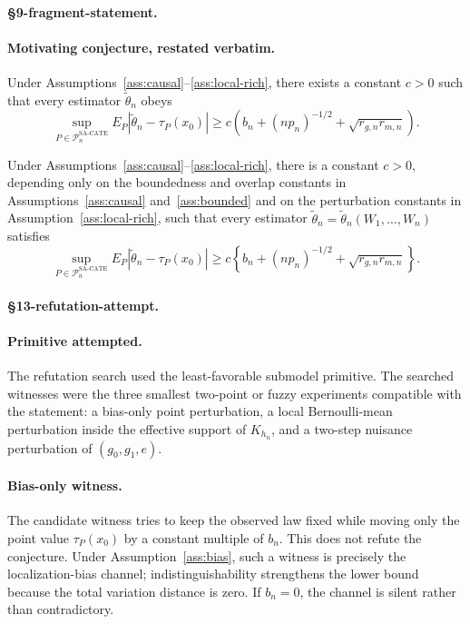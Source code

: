 \paragraph{\S9-fragment-statement.}
\paragraph{Motivating conjecture, restated verbatim.}
Under Assumptions~\ref{ass:causal}--\ref{ass:local-rich}, there exists a constant $c>0$ such that every estimator $\tilde\theta_n$ obeys
\[
  \sup_{P\in\mathcal{P}_n^{\mathrm{SA\text{-}CATE}}}
  E_P\left|\tilde\theta_n-\tau_P(x_0)\right|
  \ge c\left(b_n+(n p_n)^{-1/2}+\sqrt{r_{g,n}r_{m,n}}\right).
\]

\begin{theorem}\label{thm:lower}
Under Assumptions~\ref{ass:causal}--\ref{ass:local-rich}, there is a constant $c>0$, depending only on the boundedness and overlap constants in Assumptions~\ref{ass:causal} and~\ref{ass:bounded} and on the perturbation constants in Assumption~\ref{ass:local-rich}, such that every estimator $\tilde\theta_n=\tilde\theta_n(W_1,\ldots,W_n)$ satisfies \[ \sup_{P\in\mathcal{P}_n^{\mathrm{SA\text{-}CATE}}} E_P\!\left|\tilde\theta_n-\tau_P(x_0)\right| \ge c\left\{b_n+(n p_n)^{-1/2}+\sqrt{r_{g,n}r_{m,n}}\right\}. \]
\end{theorem}

\paragraph{\S13-refutation-attempt.}
\paragraph{Primitive attempted.}
The refutation search used the least-favorable submodel primitive.  The searched witnesses were the three smallest two-point or fuzzy experiments compatible with the statement: a bias-only point perturbation, a local Bernoulli-mean perturbation inside the effective support of $K_{h_n}$, and a two-step nuisance perturbation of $(g_0,g_1,e)$.

\paragraph{Bias-only witness.}
The candidate witness tries to keep the observed law fixed while moving only the point value $\tau_P(x_0)$ by a constant multiple of $b_n$.  This does not refute the conjecture.  Under Assumption~\ref{ass:bias}, such a witness is precisely the localization-bias channel; indistinguishability strengthens the lower bound because the total variation distance is zero.  If $b_n=0$, the channel is silent rather than contradictory.

